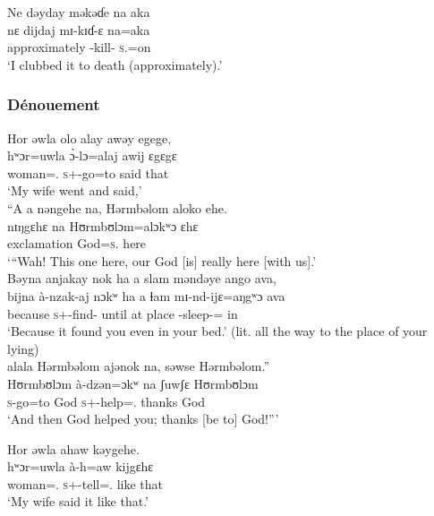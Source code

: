 \ea
 Ne {dəyday}  məkəɗe  na  aka\\
\gll nɛ {dijdaj}              mɪ-kɪɗ-ɛ      na=aka\\
{\oneS}  approximately     {\NOM}{}-kill-{\CL}  \textsc{s}.{\DO}=on\\
\glt ‘I clubbed it to death (approximately).’
\z

\subsubsection*{Dénouement}
\ea Hor  əwla   olo  alay  awəy  egege,\\
\gll hʷɔr=uwla      \`ɔ{}-lɔ=alaj            awij ɛgɛgɛ\\
woman={\oneS}.{\POSS} \textsc{s}+{\PFV}-go=to           said that\\
\glt ‘My wife went and said,’\\

\medskip
 “{A a}  nəngehe  na,  Hərmbəlom  aloko  ehe.\\
     nɪŋgɛhɛ   na   Hʊrmbʊlɔm=alɔkʷɔ        ɛhɛ\\
exclamation   {\DEM}     {\PSP}  God=\textsc{s}.{\POSS}   here \\
\glt ‘“Wah! This one here, our God [is] really here [with us].’\\

\medskip
 Bəyna  anjakay  nok  ha  a  slam  məndəye  ango  ava,\\
\gll bijna      à-nzak-aj          nɔkʷ   ha      a    ɬam      mɪ-nd-ijɛ=aŋgʷɔ  ava\\
because   \textsc{s}+{\PFV}-find{}-{\CL}  {\twoS}      until  at      place  {\NOM}{}-sleep-{\CL}={\twoS}       in\\
\glt ‘Because it found you even in your bed.’ (lit. all the way to the place of your lying)\\

\medskip
 alala  Hərmbəlom  ajənok  na,  səwse   Hərmbəlom.”\\
   Hʊrmbʊlɔm    à-dzən=ɔkʷ     {na   ʃuwʃɛ}   Hʊrmbʊlɔm\\
\textsc{s}-go=to  God         \textsc{s}+{\PFV}-help={\twoS}.{\IO}  {{\PSP}  thanks}   God\\
\glt ‘And then God helped you; thanks [be to] God!”’
\z

\ea Hor  əwla  ahaw  kəygehe.\\
\gll hʷɔr=uwla     à-h=aw kijgɛhɛ\\
woman={\oneS}.{\POSS}    \textsc{s}+{\PFV}-tell={\oneS}.{\IO}     {like that}\\
\glt ‘My wife said it like that.’
\z

